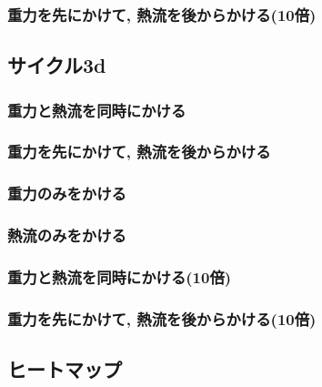 \subsubsection{重力を先にかけて, 熱流を後からかける(10倍)}



\subsection{サイクル3d}

\subsubsection{重力と熱流を同時にかける}



\subsubsection{重力を先にかけて, 熱流を後からかける}



\subsubsection{重力のみをかける}



\subsubsection{熱流のみをかける}



\subsubsection{重力と熱流を同時にかける(10倍)}

\subsubsection{重力を先にかけて, 熱流を後からかける(10倍)}




\subsection{ヒートマップ}

